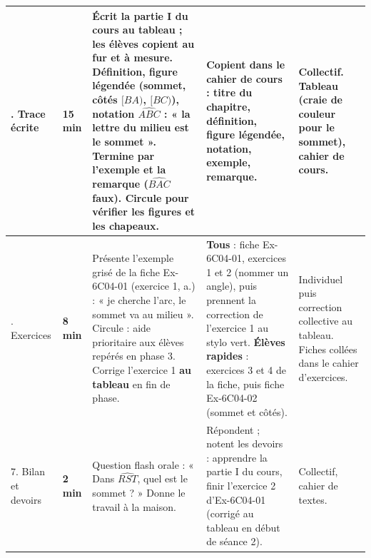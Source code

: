 \documentclass[11pt]{article}
\newcommand{\minutes}[1]{\textbf{#1 min}}
\begin{document}
\begin{tabularx}{\linewidth}{|>{\raggedright\arraybackslash}p{2.1cm}|>{\centering\arraybackslash}p{0.9cm}|X|X|>{\raggedright\arraybackslash}p{2cm}|}
5. Trace écrite &
\minutes{15} &
Écrit la partie I du cours au tableau ; les élèves copient au fur et à mesure. Définition, figure légendée (sommet, côtés $[BA)$, $[BC)$), notation $\widehat{ABC}$ : « la lettre du milieu est le sommet ». Termine par l'exemple et la remarque ($\widehat{BAC}$ faux). Circule pour vérifier les figures et les chapeaux. &
Copient dans le cahier de cours : titre du chapitre, définition, figure légendée, notation, exemple, remarque. &
Collectif. Tableau (craie de couleur pour le sommet), cahier de cours. \\ \hline

6. Exercices &
\minutes{8} &
Présente l'exemple grisé de la fiche Ex-6C04-01 (exercice 1, a.) : « je cherche l'arc, le sommet va au milieu ». Circule : aide prioritaire aux élèves repérés en phase 3. Corrige l'exercice 1 \textbf{au tableau} en fin de phase. &
\textbf{Tous} : fiche Ex-6C04-01, exercices 1 et 2 (nommer un angle), puis prennent la correction de l'exercice 1 au stylo vert.\newline
\textbf{Élèves rapides} : exercices 3 et 4 de la fiche, puis fiche Ex-6C04-02 (sommet et côtés). &
Individuel puis correction collective au tableau. Fiches collées dans le cahier d'exercices. \\ \hline

7. Bilan et devoirs &
\minutes{2} &
Question flash orale : « Dans $\widehat{RST}$, quel est le sommet ? » Donne le travail à la maison. &
Répondent ; notent les devoirs : apprendre la partie I du cours, finir l'exercice 2 d'Ex-6C04-01 (corrigé au tableau en début de séance 2). &
Collectif, cahier de textes. \\ \hline

\end{tabularx}
\normalsize
\end{document}
